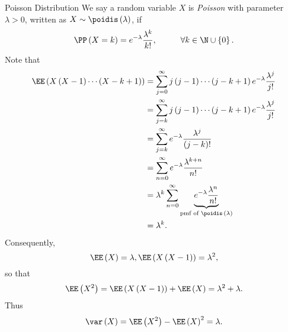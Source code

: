 \documentclass[stat901]{subfiles}
\begin{document}
    \rruleline

    \begin{example}{Poisson Distribution}
        We say a random variable $X$ is \emph{Poisson} with parameter $\lambda>0$, written as $X\sim\poidis\left( \lambda \right)$, if
        \begin{equation*}
            \PP\left( X=k \right) = e^{-\lambda} \frac{\lambda^k}{k!}, \hspace{1cm}\forall k\in\N\cup\left\lbrace 0 \right\rbrace.
        \end{equation*}
        Note that
        \begin{equation*}
            \begin{aligned}
                \EE\left( X\left( X-1 \right)\cdots\left( X-k+1 \right) \right) & = \sum^{\infty}_{j=0} j\left( j-1 \right)\cdots\left( j-k+1 \right) e^{-\lambda} \frac{\lambda^j}{j!} \\
                                                                                & = \sum^{\infty}_{j=k} j\left( j-1 \right)\cdots\left( j-k+1 \right) e^{-\lambda} \frac{\lambda^j}{j!} \\
                                                                                & = \sum^{\infty}_{j=k} e^{-\lambda} \frac{\lambda^j}{\left( j-k \right)!} \\
                                                                                & = \sum^{\infty}_{n=0} e^{-\lambda} \frac{\lambda^{k+n}}{n!} \\
                                                                                & = \lambda^k\sum^{\infty}_{n=0} \underbrace{e^{-\lambda} \frac{\lambda^n}{n!}}_{\text{pmf of $\poidis\left( \lambda \right)$}} \\
                                                                                & = \lambda^k.
            \end{aligned} 
        \end{equation*}
        Consequently,
        \begin{equation*}
            \EE\left( X \right) = \lambda, \EE\left( X\left( X-1 \right) \right) = \lambda^{2},
        \end{equation*}
        so that
        \begin{equation*}
            \EE\left( X^{2} \right) = \EE\left( X\left( X-1 \right) \right)+\EE\left( X \right) = \lambda^{2}+\lambda.
        \end{equation*}
        Thus
        \begin{equation*}
            \var\left( X \right) = \EE\left( X^{2} \right) - \EE\left( X \right)^{2} = \lambda.
        \end{equation*}
    \end{example}
\end{document}
